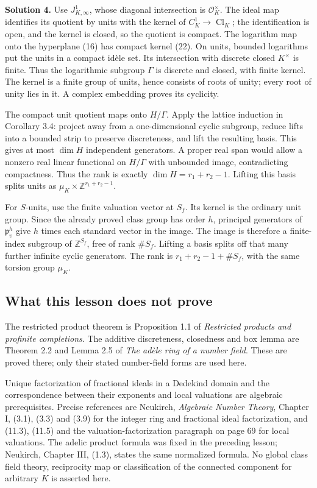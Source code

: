 \documentclass[
  english,
  11pt,
  a4paper,
]{article}
\begin{document}
\textbf{Solution 4.} Use \(J_{K,\infty}^1\), whose diagonal intersection
is \(\mathcal O_K^\times\). The ideal map identifies its quotient by
units with the kernel of \(C_K^1\to\operatorname{Cl}_K\); the
identification is open, and the kernel is closed, so the quotient is
compact. The logarithm map onto the hyperplane (16) has compact kernel
(22). On units, bounded logarithms put the units in a compact idèle set.
Its intersection with discrete closed \(K^\times\) is finite. Thus the
logarithmic subgroup \(\Gamma\) is discrete and closed, with finite
kernel. The kernel is a finite group of units, hence consists of roots
of unity; every root of unity lies in it. A complex embedding proves its
cyclicity.

The compact unit quotient maps onto \(H/\Gamma\). Apply the lattice
induction in Corollary 3.4: project away from a one-dimensional cyclic
subgroup, reduce lifts into a bounded strip to preserve discreteness,
and lift the resulting basis. This gives at most \(\dim H\) independent
generators. A proper real span would allow a nonzero real linear
functional on \(H/\Gamma\) with unbounded image, contradicting
compactness. Thus the rank is exactly \(\dim H=r_1+r_2-1\). Lifting this
basis splits units as \(\mu_K\times\mathbb Z^{r_1+r_2-1}\).

For \(S\)-units, use the finite valuation vector at \(S_f\). Its kernel
is the ordinary unit group. Since the already proved class group has
order \(h\), principal generators of \(\mathfrak p_v^h\) give \(h\)
times each standard vector in the image. The image is therefore a
finite-index subgroup of \(\mathbb Z^{S_f}\), free of rank \(\#S_f\).
Lifting a basis splits off that many further infinite cyclic generators.
The rank is \(r_1+r_2-1+\#S_f\), with the same torsion group \(\mu_K\).

\subsection{What this lesson does not
prove}\label{NT-ADL-03--what-this-lesson-does-not-prove}

The restricted product theorem is Proposition 1.1 of \emph{Restricted
products and profinite completions}. The additive discreteness,
closedness and box lemma are Theorem 2.2 and Lemma 2.5 of \emph{The
adèle ring of a number field}. These are proved there; only their stated
number-field forms are used here.

Unique factorization of fractional ideals in a Dedekind domain and the
correspondence between their exponents and local valuations are
algebraic prerequisites. Precise references are Neukirch,
\emph{Algebraic Number Theory}, Chapter I, (3.1), (3.3) and (3.9) for
the integer ring and fractional ideal factorization, and (11.3), (11.5)
and the valuation-factorization paragraph on page 69 for local
valuations. The adelic product formula was fixed in the preceding
lesson; Neukirch, Chapter III, (1.3), states the same normalized
formula. No global class field theory, reciprocity map or classification
of the connected component for arbitrary \(K\) is asserted here.
\end{document}
